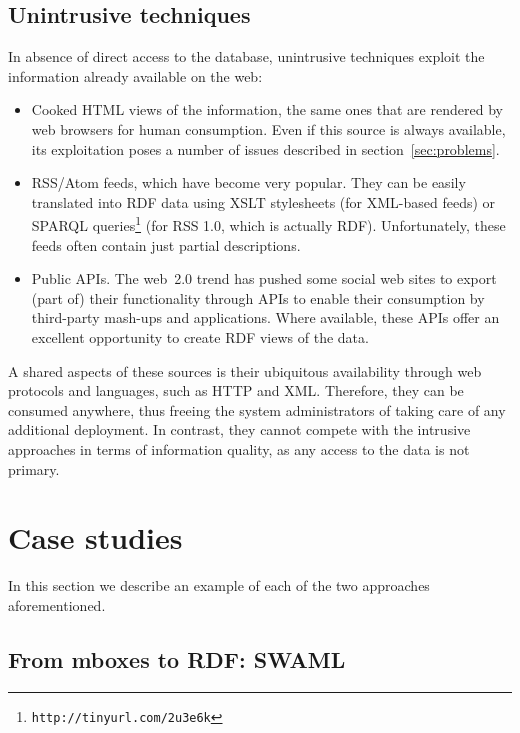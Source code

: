 \documentclass{../templates/www2008-submission}
\begin{document}
\subsection{Unintrusive techniques}

In absence of direct access to the database, unintrusive
techniques exploit the information already available on the web:

\begin{itemize}

\item Cooked HTML views of the information, the same ones that
are rendered by web browsers for human consumption. Even if this 
source is always available, its exploitation poses a number of 
issues described in section~\ref{sec:problems}.

\item RSS/Atom feeds, which have become very popular. They can be easily
translated into RDF data using XSLT stylesheets (for XML-based feeds) or 
SPARQL queries\footnote{\texttt{http://tinyurl.com/2u3e6k}} (for RSS 1.0, 
which is actually RDF). Unfortunately, these feeds often contain just 
partial descriptions.

\item Public APIs. The web~2.0 trend has pushed some social web
sites to export (part of) their functionality through APIs
to enable their consumption by third-party mash-ups and applications.
Where available, these APIs offer an excellent opportunity to
create RDF views of the data.

\end{itemize}

A shared aspects of these sources is their ubiquitous availability through
web protocols and languages, such as HTTP and XML. Therefore, they
can be consumed anywhere, thus freeing the system administrators of
taking care of any additional deployment. In contrast, they cannot compete
with the intrusive approaches in terms of information quality, as
any access to the data is not primary.

\section{\label{sec:case-studies}Case studies}

In this section we describe an example of each of the two approaches
aforementioned.

\subsection{From mboxes to RDF: SWAML}
\end{document}
